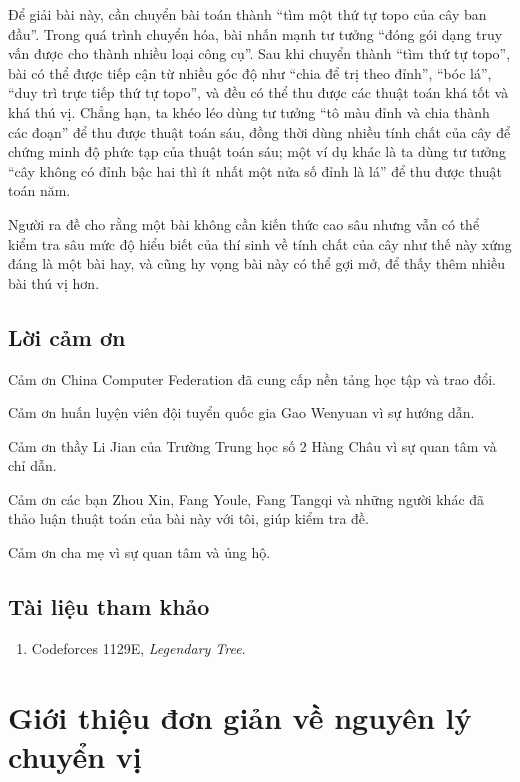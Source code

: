 \documentclass[11pt]{article}
\begin{document}
Để giải bài này, cần chuyển bài toán thành ``tìm một thứ tự topo của cây ban
đầu''. Trong quá trình chuyển hóa, bài nhấn mạnh tư tưởng ``đóng gói dạng truy
vấn được cho thành nhiều loại công cụ''. Sau khi chuyển thành ``tìm thứ tự
topo'', bài có thể được tiếp cận từ nhiều góc độ như ``chia để trị theo đỉnh'',
``bóc lá'', ``duy trì trực tiếp thứ tự topo'', và đều có thể thu được các thuật
toán khá tốt và khá thú vị. Chẳng hạn, ta khéo léo dùng tư tưởng ``tô màu đỉnh
và chia thành các đoạn'' để thu được thuật toán sáu, đồng thời dùng nhiều tính
chất của cây để chứng minh độ phức tạp của thuật toán sáu; một ví dụ khác là
ta dùng tư tưởng ``cây không có đỉnh bậc hai thì ít nhất một nửa số đỉnh là lá''
để thu được thuật toán năm.

Người ra đề cho rằng một bài không cần kiến thức cao sâu nhưng vẫn có thể kiểm
tra sâu mức độ hiểu biết của thí sinh về tính chất của cây như thế này xứng
đáng là một bài hay, và cũng hy vọng bài này có thể gợi mở, để thấy thêm nhiều
bài thú vị hơn.

\subsection{Lời cảm ơn}

Cảm ơn China Computer Federation đã cung cấp nền tảng học tập và trao đổi.

Cảm ơn huấn luyện viên đội tuyển quốc gia Gao Wenyuan vì sự hướng dẫn.

Cảm ơn thầy Li Jian của Trường Trung học số 2 Hàng Châu vì sự quan tâm và chỉ
dẫn.

Cảm ơn các bạn Zhou Xin, Fang Youle, Fang Tangqi và những người khác đã thảo
luận thuật toán của bài này với tôi, giúp kiểm tra đề.

Cảm ơn cha mẹ vì sự quan tâm và ủng hộ.

\subsection*{Tài liệu tham khảo}

\begin{enumerate}
  \item Codeforces 1129E, \emph{Legendary Tree}.
\end{enumerate}

\section{Giới thiệu đơn giản về nguyên lý chuyển vị}
\end{document}
